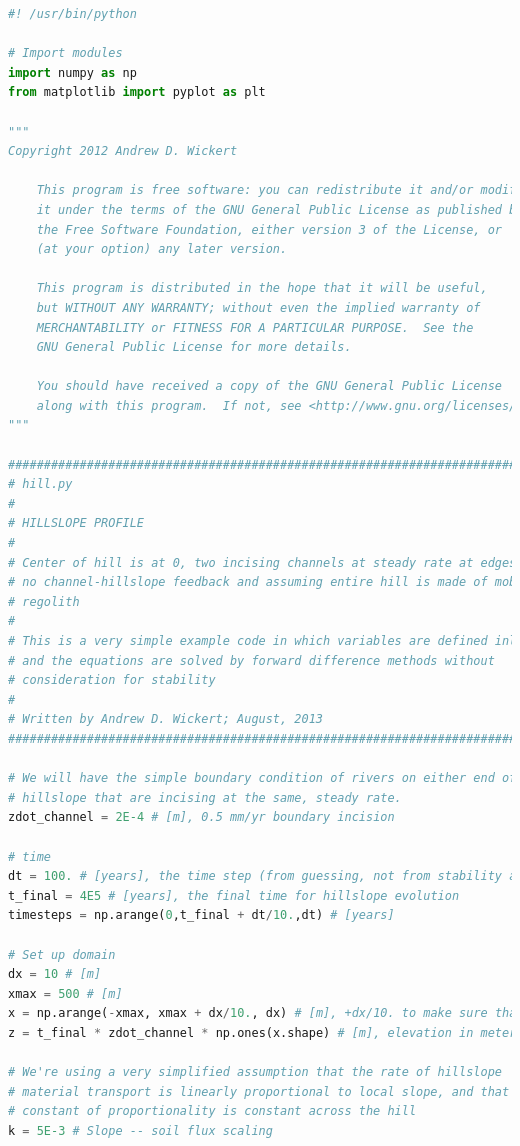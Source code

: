 \documentclass[a4paper,10pt]{scrartcl}
\begin{document}
\begin{lstlisting}[language=Python]
#! /usr/bin/python

# Import modules
import numpy as np
from matplotlib import pyplot as plt

"""
Copyright 2012 Andrew D. Wickert

    This program is free software: you can redistribute it and/or modify
    it under the terms of the GNU General Public License as published by
    the Free Software Foundation, either version 3 of the License, or
    (at your option) any later version.

    This program is distributed in the hope that it will be useful,
    but WITHOUT ANY WARRANTY; without even the implied warranty of
    MERCHANTABILITY or FITNESS FOR A PARTICULAR PURPOSE.  See the
    GNU General Public License for more details.

    You should have received a copy of the GNU General Public License
    along with this program.  If not, see <http://www.gnu.org/licenses/>.
"""

################################################################################
# hill.py
# 
# HILLSLOPE PROFILE
# 
# Center of hill is at 0, two incising channels at steady rate at edges
# no channel-hillslope feedback and assuming entire hill is made of mobile 
# regolith
# 
# This is a very simple example code in which variables are defined inline, 
# and the equations are solved by forward difference methods without 
# consideration for stability
# 
# Written by Andrew D. Wickert; August, 2013
################################################################################

# We will have the simple boundary condition of rivers on either end of the 
# hillslope that are incising at the same, steady rate.
zdot_channel = 2E-4 # [m], 0.5 mm/yr boundary incision

# time
dt = 100. # [years], the time step (from guessing, not from stability analysis)
t_final = 4E5 # [years], the final time for hillslope evolution
timesteps = np.arange(0,t_final + dt/10.,dt) # [years]

# Set up domain
dx = 10 # [m]
xmax = 500 # [m]
x = np.arange(-xmax, xmax + dx/10., dx) # [m], +dx/10. to make sure that edges are included
z = t_final * zdot_channel * np.ones(x.shape) # [m], elevation in meters - set such that the edges are 0 at t_final

# We're using a very simplified assumption that the rate of hillslope 
# material transport is linearly proportional to local slope, and that this 
# constant of proportionality is constant across the hill
k = 5E-3 # Slope -- soil flux scaling


\end{lstlisting}
\end{document}
